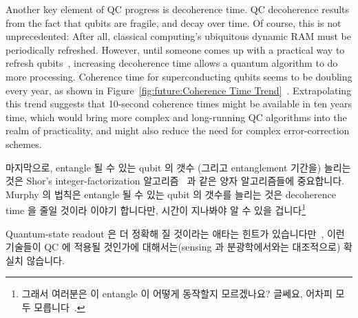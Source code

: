 Another key element of QC progress is decoherence time.
QC decoherence results from the fact that qubits are fragile, and
decay over time.
Of course, this is not unprecedented: After all, classical computing's
ubiquitous dynamic RAM must be periodically refreshed.
However, until someone comes up with a practical way to refresh
qubits~\cite{GiorgioColangelo2017QC-SpinAngleAmplitude},
increasing decoherence time allows a quantum algorithm to do more
processing.
Coherence time for superconducting qubits seems to be doubling every year,
as shown in
Figure~\ref{fig:future:Coherence Time Trend}~\cite{IBM2016QuantumExperience}.
Extrapolating this trend suggests that 10-second coherence times might
be available in ten years time, which would bring more complex and
long-running QC algorithms into the realm of practicality, and might
also reduce the need for complex error-correction schemes.
\fi

마지막으로, entangle 될 수 있는 qubit 의 갯수 (그리고 entanglement 기간을)
늘리는 것은 Shor's integer-factorization
알고리즘~\cite{Shor:1997:PAP:264393.264406,Kendon:2006:ERS:2011698.2011704} 과
같은 양자 알고리즘들에 중요합니다.
Murphy 의 법칙은 entangle 될 수 있는 qubit 의 갯수를 늘리는 것은 decoherence
time 을 줄일 것이라 이야기 합니다만, 시간이 지나봐야 알 수 있을
겁니다\footnote{
	그래서 여러분은 이 entangle 이 어떻게 동작할지 모르겠나요?
	글쎄요, 어차피 모두 모릅니다~\cite{ScottAaronson2018QuantumInterp}.}

Quantum-state readout 은 더 정확해 질 것이라는 애타는 힌트가
있습니다만~\cite{GiorgioColangelo2017QC-SpinAngleAmplitude}, 이런 기술들이 QC
에 적용될 것인가에 대해서는(sensing 과 분광학에서와는 대조적으로) 확실치
않습니다.

